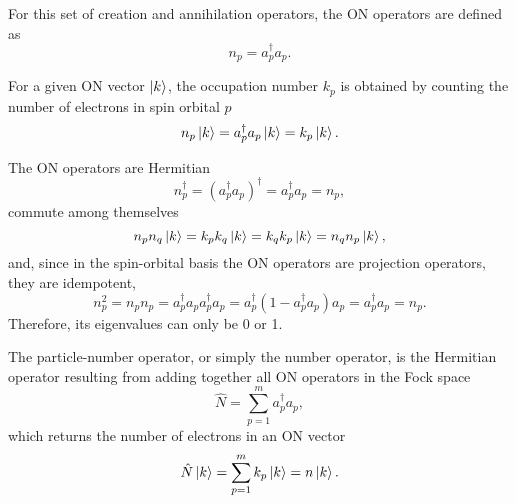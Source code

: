 For this set of creation and annihilation operators, the ON operators are
defined as
\begin{equation}
    n_p = a_p^{\dagger} a_p
    .
\end{equation}

For a given ON vector $\Ket{k}$, the occupation number $k_p$ is obtained by
counting the number of electrons in spin orbital $p$
\begin{equation}
    n_p \Ket{k} =
    a_p^{\dagger} a_p \Ket{k} =
    k_p \Ket{k}
    .
\end{equation}

The ON operators are Hermitian 
\begin{equation}
    n_p^{\dagger} =
    \left( a_p^{\dagger} a_p \right)^{\dagger} =
    a_p^{\dagger} a_p =
    n_p
    ,
\end{equation}
commute among themselves 
\begin{equation}
    n_p n_q \Ket{k} =
    k_p k_q \Ket{k} =
    k_q k_p \Ket{k} =
    n_q n_p \Ket{k}
    ,
\end{equation}
and,
since in the spin-orbital basis the ON operators are projection operators,
they are idempotent, 
\begin{equation}
    n_p^2 =
    n_p n_p =
    a_p^{\dagger} a_p a_p^{\dagger} a_p =
    a_p^{\dagger} \left( 1 - a_p^{\dagger} a_p \right) a_p =
    a_p^{\dagger} a_p =
    n_p
    .
\end{equation}
Therefore, its eigenvalues can only be 0 or 1.

The particle-number operator, or simply the number operator, is the Hermitian
operator resulting from adding together all ON operators in the Fock space 
\begin{equation}
    \hat{N} =
    \sum_{p=1}^{m} a_p^{\dagger} a_p
    ,
\end{equation}
which returns the number of electrons in an ON vector 
\begin{equation}
    \hat{N} \Ket{k} =
    \sum_{p=1}^{m} k_p \Ket{k} =
    n \Ket{k}
    .
\end{equation}

